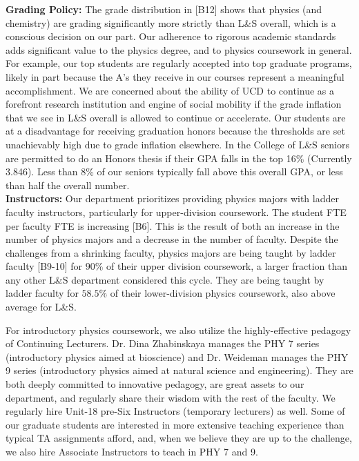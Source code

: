 \documentclass[12pt]{article}
\begin{document}
\noindent
{\bf Grading Policy:} The grade distribution in [B12] shows that
physics (and chemistry) are grading significantly more strictly than
L\&S overall, which is a conscious decision on our part.  Our
adherence to rigorous academic standards adds significant value to the
physics degree, and to physics coursework in general.  For example,
our top students are regularly accepted into top graduate programs,
likely in part because the A's they receive in our courses represent a
meaningful accomplishment.  We are concerned about the ability of UCD
to continue as a forefront research institution and engine of social
mobility if the grade inflation that we see in L\&S overall is allowed
to continue or accelerate.  Our students are at a disadvantage for
receiving graduation honors because the thresholds are set
unachievably high due to grade inflation elsewhere.  In the College of 
L\&S seniors are permitted to do an Honors thesis if their GPA  falls 
in the top 16\%  (Currently 3.846).  Less than 8\% of our seniors typically 
fall above this overall GPA, or less than half the overall number.\\[3pt]

\noindent
{\bf Instructors:} Our department prioritizes providing physics majors
with ladder faculty instructors, particularly for upper-division
coursework.  The student FTE per faculty FTE is increasing [B6].  This
is the result of both an increase in the number of physics majors and
a decrease in the number of faculty.  Despite the challenges from a
shrinking faculty, physics majors are being taught by ladder faculty
[B9-10] for $90\%$ of their upper division coursework, a larger
fraction than any other L\&S department considered this cycle.  They
are being taught by ladder faculty for $58.5\%$ of their
lower-division physics coursework, also above average for L\&S.

For introductory physics coursework, we also utilize the
highly-effective pedagogy of Continuing Lecturers.  Dr. Dina
Zhabinskaya manages the PHY 7 series (introductory physics aimed at
bioscience) and Dr. Weideman manages the PHY 9 series (introductory
physics aimed at natural science and engineering).  They are both
deeply committed to innovative pedagogy, are great assets to our
department, and regularly share their wisdom with the rest of the
faculty.  We regularly hire Unit-18 pre-Six Instructors (temporary
lecturers) as well.  Some of our graduate students are interested in
more extensive teaching experience than typical TA assignments afford,
and, when we believe they are up to the challenge, we also hire
Associate Instructors to teach in PHY 7 and 9.\\[3pt]
\end{document}

